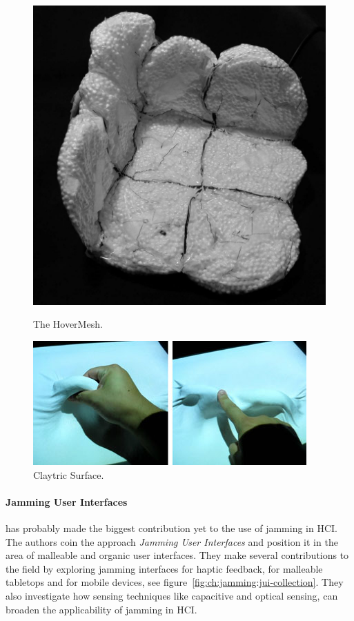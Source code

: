\begin{figure}
\centering
\begin{minipage}[t]{.5\textwidth}
  \centering
  \includegraphics[width=.8\linewidth]{figures/jamming/hovermesh}
  \caption[The HoverMesh by \citet{mazzone2004hovermesh}.]
  {The HoverMesh.}
  \label{fig:ch:jamming:hovermesh}
\end{minipage}%
\begin{minipage}[t]{.5\textwidth}
  \centering
  \includegraphics[width=.8\linewidth]{figures/jamming/claytric-surface}
  \caption[Claytric Surface by \citet{matoba2012claytricsurface}.]
  {Claytric Surface.}
  \label{fig:ch:jamming:claytric-surface}
\end{minipage}
\end{figure}

\paragraph{Jamming User Interfaces}
\label{ch:jamming:related-work:hci:jui} 
\citet{follmer2012jamming} has probably made the biggest contribution yet to the use of jamming in HCI. 
The authors coin the approach \textit{Jamming User Interfaces} and position it in the area of malleable and organic user interfaces. 
They make several contributions to the field by exploring jamming interfaces for haptic feedback, for malleable tabletops and for mobile devices, see figure~\ref{fig:ch:jamming:jui-collection}. 
They also investigate how sensing techniques like capacitive and optical sensing, can broaden the applicability of jamming in HCI. 

